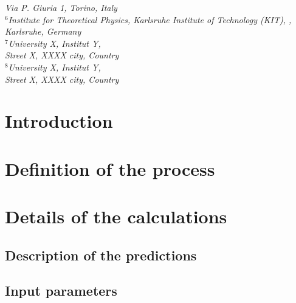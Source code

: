 \documentclass[11pt,epsf]{article}
\begin{document}
{{\small\it Via P. Giuria 1,  Torino, %
        Italy}\\[3mm]
{\small\it
$^6$Institute for Theoretical Physics, Karlsruhe Institute of
Technology (KIT), 
,} \\ %
{\small\it Karlsruhe, Germany}\\[3mm]
{\small\it
$^7$University X, %
        Institut Y,} \\ %
{\small\it Street X, \linebreak %
        XXXX city, %
        Country}\\[3mm]
{\small\it
$^8$University X, %
        Institut Y,} \\ %
{\small\it Street X, \linebreak %
        XXXX city, %
        Country}\\[3mm]
        }


\maketitle

\newpage



\section{Introduction}



\section{Definition of the process}

\section{Details of the calculations}

\subsection{Description of the predictions}



\subsection{Input parameters}


\end{document}
